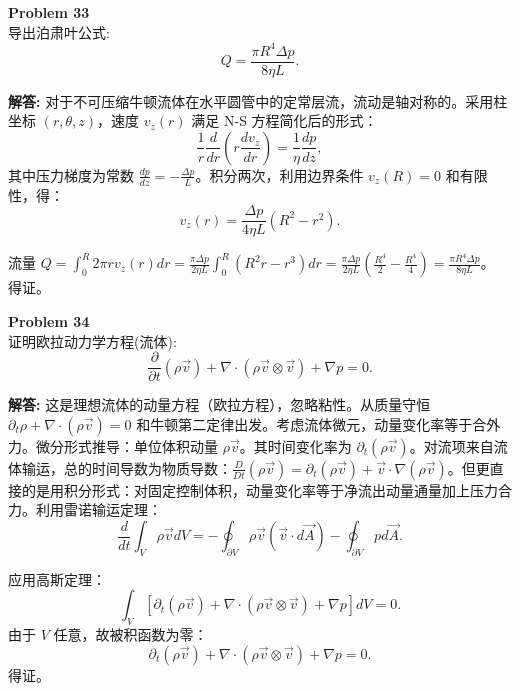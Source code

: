 \documentclass[12pt, a4paper, oneside]{ctexart}
\newenvironment{solution}{\par\noindent\textbf{解答:}\quad}{\par}
\begin{document}
\begin{mdframed}[backgroundcolor=gray!10, linewidth=0pt]
    \textbf{Problem 33} \\
    导出泊肃叶公式:
    \[
    Q = \frac{\pi R^4 \Delta p}{8\eta L}.
    \]
\end{mdframed}
\begin{solution}
    对于不可压缩牛顿流体在水平圆管中的定常层流，流动是轴对称的。采用柱坐标 \((r, \theta, z)\)，速度 \(v_z(r)\) 满足 N-S 方程简化后的形式：
    \[
    \frac{1}{r} \frac{d}{dr} \left( r \frac{d v_z}{dr} \right) = \frac{1}{\eta} \frac{d p}{d z},
    \]
    其中压力梯度为常数 \(\frac{dp}{dz} = -\frac{\Delta p}{L}\)。积分两次，利用边界条件 \(v_z(R)=0\) 和有限性，得：
    \[
    v_z(r) = \frac{\Delta p}{4\eta L} (R^2 - r^2).
    \]
    
    流量 \(Q = \int_0^R 2\pi r v_z(r) dr = \frac{\pi \Delta p}{2\eta L} \int_0^R (R^2 r - r^3) dr = \frac{\pi \Delta p}{2\eta L} \left( \frac{R^4}{2} - \frac{R^4}{4} \right) = \frac{\pi R^4 \Delta p}{8\eta L}\)。
    得证。
\end{solution}

\begin{mdframed}[backgroundcolor=gray!10, linewidth=0pt]
    \textbf{Problem 34} \\
    证明欧拉动力学方程(流体):
    \[
    \frac{\partial}{\partial t}(\rho\vec{v}) + \nabla\cdot(\rho\vec{v}\otimes\vec{v}) + \nabla p = 0.
    \]
\end{mdframed}
\begin{solution}
    这是理想流体的动量方程（欧拉方程），忽略粘性。从质量守恒 \(\partial_t \rho + \nabla \cdot (\rho \vec{v}) = 0\) 和牛顿第二定律出发。考虑流体微元，动量变化率等于合外力。微分形式推导：单位体积动量 \(\rho \vec{v}\)。其时间变化率为 \(\partial_t (\rho \vec{v})\)。对流项来自流体输运，总的时间导数为物质导数：\(\frac{D}{Dt} (\rho \vec{v}) = \partial_t (\rho \vec{v}) + \vec{v} \cdot \nabla (\rho \vec{v})\)。但更直接的是用积分形式：对固定控制体积，动量变化率等于净流出动量通量加上压力合力。利用雷诺输运定理：
    \[
    \frac{d}{dt} \int_V \rho \vec{v} dV = - \oint_{\partial V} \rho \vec{v} (\vec{v} \cdot d\vec{A}) - \oint_{\partial V} p d\vec{A}.
    \]
    
    应用高斯定理：
    \[
    \int_V \left[ \partial_t (\rho \vec{v}) + \nabla \cdot (\rho \vec{v} \otimes \vec{v}) + \nabla p \right] dV = 0.
    \]
    由于 \(V\) 任意，故被积函数为零：
    \[
    \partial_t (\rho \vec{v}) + \nabla \cdot (\rho \vec{v} \otimes \vec{v}) + \nabla p = 0.
    \]
    得证。
\end{solution}
\end{document}
